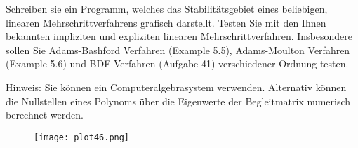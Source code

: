 \begin{exercise}
  Schreiben sie ein Programm, welches das Stabilitätsgebiet
  eines beliebigen, linearen Mehrschrittverfahrens grafisch
  darstellt. Testen Sie mit den Ihnen bekannten impliziten
  und expliziten linearen Mehrschrittverfahren. Insbesondere
  sollen Sie Adams-Bashford Verfahren (Example 5.5),
  Adams-Moulton Verfahren (Example 5.6) und BDF Verfahren
  (Aufgabe 41) verschiedener Ordnung testen.

  Hinweis: Sie können ein Computeralgebrasystem verwenden.
  Alternativ können die Nullstellen eines Polynoms über die
  Eigenwerte der Begleitmatrix numerisch berechnet werden.
\end{exercise}

\begin{solution}
\begin{figure}
    \centering
    \texttt{[image: plot46.png]}
\end{figure}
\FloatBarrier
\end{solution}
